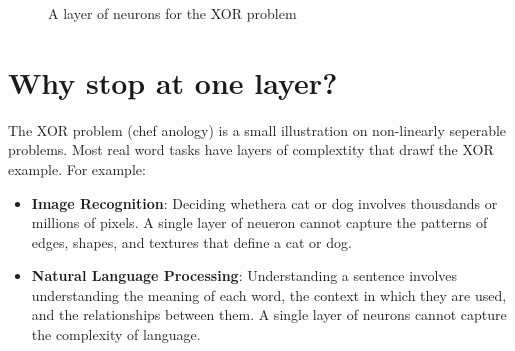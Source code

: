 \documentclass[9pt]{extarticle}
\begin{document}
\begin{figure}[h]
\begin{subfigure}[b]{0.5\textwidth}
    \end{subfigure}
    \caption{A layer of neurons for the XOR problem}
\end{figure}

\section{Why stop at one layer?}
The XOR problem (chef anology) is a small illustration on non-linearly seperable problems. Most real word tasks have layers of complextity that drawf the XOR example. For example:
\begin{itemize}
    \item \textbf{Image Recognition}: Deciding whethera cat or dog involves thousdands or millions of pixels. A single layer of neueron cannot capture the patterns of edges, shapes, and textures that define a cat or dog.
    \item \textbf{Natural Language Processing}: Understanding a sentence involves understanding the meaning of each word, the context in which they are used, and the relationships between them. A single layer of neurons cannot capture the complexity of language.
\end{itemize}
\end{document}
